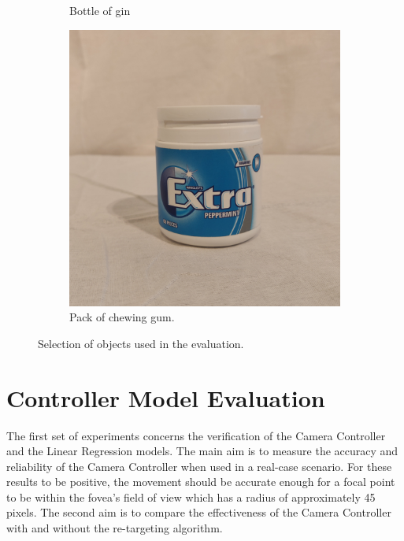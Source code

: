 \documentclass{l4proj}
\begin{document}
\begin{figure}[H]
\begin{subfigure}{0.20\textwidth}
  \caption{Bottle of gin}
  \label{ginbottle}
\end{subfigure}\hfil %
\begin{subfigure}{0.20\textwidth}
  \includegraphics[width=\linewidth]{l4template-master/images/chewing_gum.png}
  \caption{Pack of chewing gum.}
  \label{chewinggum}
\end{subfigure}
\caption{Selection of objects used in the evaluation.}
\label{objects}
\end{figure}





\section{Controller Model Evaluation}
The first set of experiments concerns the verification of the Camera Controller and the Linear Regression models. The main aim is to measure the accuracy and reliability of the Camera Controller when used in a real-case scenario. For these results to be positive, the movement should be accurate enough for a focal point to be within the fovea's field of view which has a radius of approximately 45 pixels. The second aim is to compare the effectiveness of the Camera Controller with and without the re-targeting algorithm. 
\end{document}
